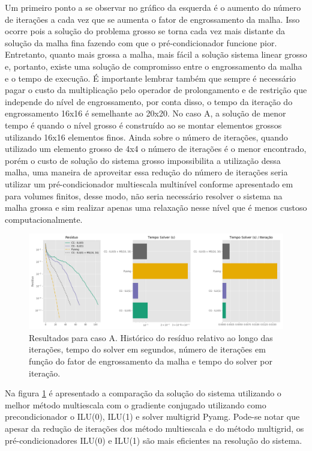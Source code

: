 Um primeiro ponto a se observar no gráfico da esquerda é o aumento do número de iterações a cada vez que se aumenta o fator de engrossamento da malha. Isso ocorre pois a solução do problema grosso se torna cada vez mais distante da solução da malha fina fazendo com que o pré-condicionador funcione pior. Entretanto, quanto mais grossa a malha, mais fácil a solução sistema linear grosso e, portanto, existe uma solução de compromisso entre o engrossamento da malha e o tempo de execução. É importante lembrar também que sempre é necessário pagar o custo da multiplicação pelo operador de prolongamento e de restrição que independe do nível de engrossamento, por conta disso, o tempo da iteração do engrossamento 16x16 é semelhante ao 20x20. No caso A, a solução de menor tempo é quando o nível grosso é construído ao se montar elementos grossos utilizando 16x16 elementos finos. Ainda sobre o número de iterações, quando utilizado um elemento grosso de 4x4 o número de iterações é o menor encontrado, porém o custo de solução do sistema grosso impossibilita a utilização dessa malha, uma maneira de aproveitar essa redução do número de iterações seria utilizar um pré-condicionador multiescala multinível conforme apresentado em \cite{multilevel} para volumes finitos, desse modo, não seria necessário resolver o sistema na malha grossa e sim realizar apenas uma relaxação nesse nível que é menos custoso computacionalmente.


\begin{figure}[!htbp]
\centering
\includegraphics[width=\textwidth]{chap08/figs/reservatorio100x100_2.png}
\caption{Resultados para caso A. Histórico do resíduo relativo ao longo das iterações, tempo do solver em segundos, número de iterações em função do fator de engrossamento da malha e tempo do solver por iteração. }
\label{fig:reservatorio100x100_2}
\end{figure}

Na figura \ref{fig:reservatorio100x100_2} é apresentado a comparação da solução do sistema utilizando o melhor método multiescala com o gradiente conjugado utilizando como precondicionador o ILU(0), ILU(1) e solver multigrid Pyamg. Pode-se notar que apesar da redução de iterações dos método multiescala e do método multigrid, os pré-condicionadores ILU(0) e ILU(1) são mais eficientes na resolução do sistema. 


